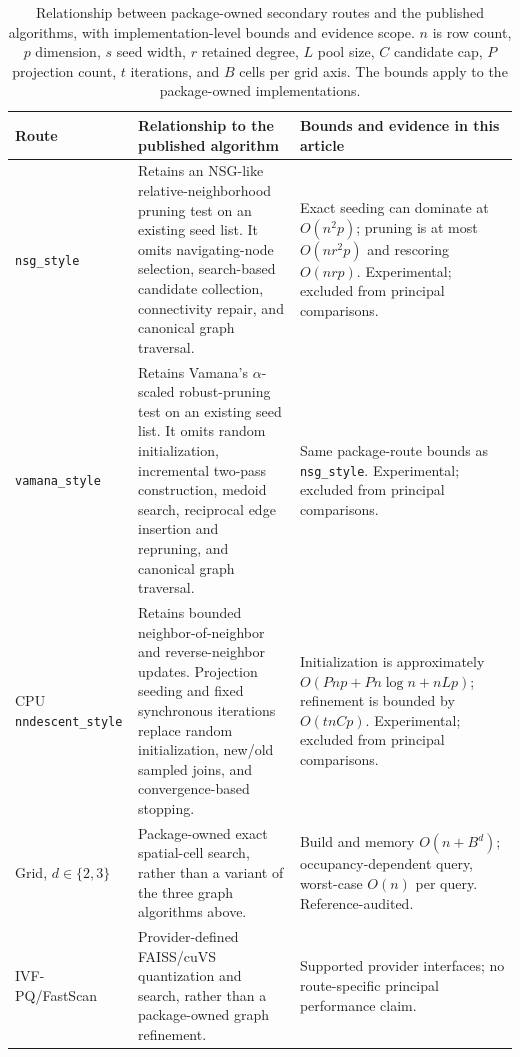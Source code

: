 \documentclass[11pt]{article}
\newcommand{\code}[1]{\texttt{#1}}
\begin{document}
\begin{table}[H]
\centering

\small
\begin{tabularx}{\textwidth}{@{}>{\raggedright\arraybackslash}p{}>{\raggedright\arraybackslash}p{}X@{}}
\toprule
Route & Relationship to the published algorithm & Bounds and evidence in this article \\
\midrule
\code{nsg\_style} & Retains an NSG-like relative-neighborhood pruning test on
an existing seed list. It omits navigating-node selection, search-based
candidate collection, connectivity repair, and canonical graph traversal. &
Exact seeding can dominate at $O(n^2p)$; pruning is at most $O(nr^2p)$ and
rescoring $O(nrp)$. Experimental; excluded from principal comparisons. \\
\code{vamana\_style} & Retains Vamana's $\alpha$-scaled robust-pruning test on
an existing seed list. It omits random initialization, incremental two-pass
construction, medoid search, reciprocal edge insertion and repruning, and
canonical graph traversal. & Same package-route bounds as
\code{nsg\_style}. Experimental; excluded from principal comparisons. \\
CPU \code{nndescent\_style} & Retains bounded neighbor-of-neighbor and
reverse-neighbor updates. Projection seeding and fixed synchronous iterations
replace random initialization, new/old sampled joins, and convergence-based
stopping. & Initialization is approximately $O(Pnp+Pn\log n+nLp)$; refinement
is bounded by $O(tnCp)$. Experimental; excluded from principal comparisons. \\
Grid, $d\in\{2,3\}$ & Package-owned exact spatial-cell search, rather than a
variant of the three graph algorithms above. & Build and memory $O(n+B^d)$;
occupancy-dependent query, worst-case $O(n)$ per query. Reference-audited. \\
IVF-PQ/FastScan \citep{FaissFastScan} & Provider-defined FAISS/cuVS
quantization and search, rather than a package-owned graph refinement. &
Supported provider interfaces; no route-specific principal performance claim. \\
\bottomrule
\end{tabularx}
\caption{Relationship between package-owned secondary routes and the
published algorithms, with implementation-level bounds and evidence scope.
$n$ is row count, $p$ dimension, $s$ seed width, $r$ retained degree, $L$ pool
size, $C$ candidate cap, $P$ projection count, $t$ iterations, and $B$ cells
per grid axis. The bounds apply to the package-owned implementations.}
\label{tab:supp-derived-methods}
\end{table}
\end{document}
